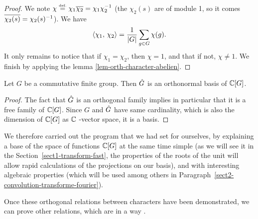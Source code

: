 \begin{proof}
We note $\chi \stackrel{\mbox{\upshape\tiny def.}}{=} \chi_1 \overline{\chi_2} = \chi_1 \chi_2^{-1}$ (the $\chi_2 (s)$ are of module 1, so it comes $\overline{\chi_2 ( s)} = \chi_2 (s)^{-1}$). We have
\begin{equation*}
\langle \chi_1,\,\chi_2\rangle = \frac{1}{|G|} \sum_{g \in G}{\chi(g)}.
\end{equation*}
It only remains to notice that if $\chi_1 = \chi_2 $, then $\chi = 1$, and that if not, $\chi \neq 1$. We finish by applying the lemma \ref{lem-orth-character-abelien}.
\end{proof}


\begin{cor}
 Let $G$ be a commutative finite group. Then $\hat{G}$ is an orthonormal basis of $\mathbb{C}[G]$.
\end{cor}
\begin{proof}
The fact that $\hat{G}$ is an orthogonal family implies in particular that it is a free family of $\mathbb{C}[G]$. Since $G$ and $\hat{G}$ have same cardinality, which is also the dimension of $\mathbb{C}[G]$ as $\mathbb{C}$ -vector space, it is a basis.
\end{proof}
We therefore carried out the program that we had set for ourselves, by explaining a base of the space of functions $\mathbb{C}[G]$ at the same time simple (as we will see it in the Section~\ref{sect1-transform-fast}, the properties of the roots of the unit will allow rapid calculations of the projections on our basis), and with interesting algebraic properties (which will be used among others in Paragraph~\ref{sect2-convolution-transforme-fourier}).


Once these orthogonal relations between characters have been demonstrated, we can prove other relations, which are in a way .


